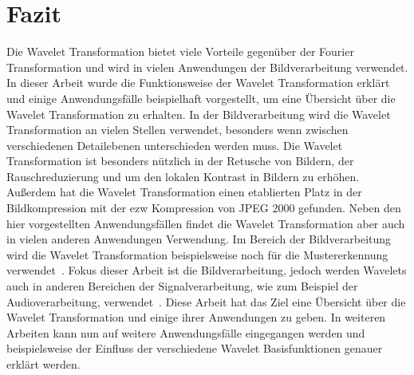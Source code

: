 \documentclass[12pt, a4paper, ngerman]{article}
\begin{document}
\section{Fazit}

Die Wavelet Transformation bietet viele Vorteile gegenüber der Fourier Transformation
und wird in vielen Anwendungen der Bildverarbeitung verwendet.
In dieser Arbeit wurde die Funktionsweise der Wavelet Transformation erklärt 
und einige Anwendungsfälle beispielhaft vorgestellt, 
um eine Übersicht über die Wavelet Transformation zu erhalten.
In der Bildverarbeitung wird die Wavelet Transformation
an vielen Stellen verwendet,
besonders wenn zwischen verschiedenen Detailebenen unterschieden werden muss.
Die Wavelet Transformation ist besonders nützlich in der Retusche von Bildern,
der Rauschreduzierung und um den lokalen Kontrast in Bildern zu erhöhen.
Außerdem hat die Wavelet Transformation einen etablierten Platz in der Bildkompression
mit der \ac{ezw} Kompression von JPEG 2000 gefunden.
Neben den hier vorgestellten Anwendungsfällen
findet die Wavelet Transformation aber auch in vielen anderen Anwendungen Verwendung.
Im Bereich der Bildverarbeitung wird die Wavelet Transformation 
beispielsweise noch für die Mustererkennung verwendet~\cite{wavelet_patterns}.
Fokus dieser Arbeit ist die Bildverarbeitung,
jedoch werden Wavelets auch in anderen Bereichen der Signalverarbeitung,
wie zum Beispiel der Audioverarbeitung, verwendet~\cite{wavelets_audio}.
Diese Arbeit hat das Ziel eine Übersicht über die Wavelet Transformation 
und einige ihrer Anwendungen zu geben.
In weiteren Arbeiten kann nun auf weitere Anwendungsfälle eingegangen werden
und beispielsweise der Einfluss der verschiedene Wavelet Basisfunktionen genauer erklärt werden.

\newpage
\printbibliography
\end{document}
